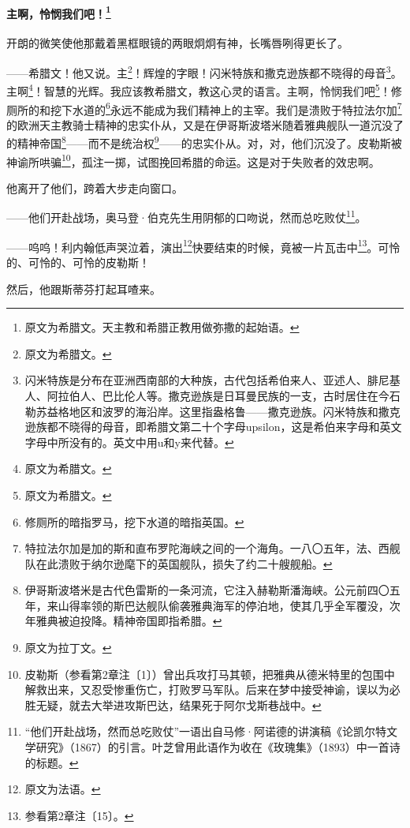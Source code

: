 \paragraph*{主啊，怜悯我们吧！\footnote{原文为希腊文。天主教和希腊正教用做弥撒的起始语。}}
\par 开朗的微笑使他那戴着黑框眼镜的两眼炯炯有神，长嘴唇咧得更长了。
\par ——希腊文！他又说。主\footnote{原文为希腊文。}！辉煌的字眼！闪米特族和撒克逊族都不晓得的母音\footnote{闪米特族是分布在亚洲西南部的大种族，古代包括希伯来人、亚述人、腓尼基人、阿拉伯人、巴比伦人等。撒克逊族是日耳曼民族的一支，古时居住在今石勒苏益格地区和波罗的海沿岸。这里指盎格鲁——撒克逊族。闪米特族和撒克逊族都不晓得的母音，即希腊文第二十个字母upsilon，这是希伯来字母和英文字母中所没有的。英文中用u和y来代替。}。主啊\footnote{原文为希腊文。}！智慧的光辉。我应该教希腊文，教这心灵的语言。主啊，怜悯我们吧\footnote{原文为希腊文。}！修厕所的和挖下水道的\footnote{修厕所的暗指罗马，挖下水道的暗指英国。}永远不能成为我们精神上的主宰。我们是溃败于特拉法尔加\footnote{特拉法尔加是加的斯和直布罗陀海峡之间的一个海角。一八〇五年，法、西舰队在此溃败于纳尔逊麾下的英国舰队，损失了约二十艘舰船。}的欧洲天主教骑士精神的忠实仆从，又是在伊哥斯波塔米随着雅典舰队一道沉没了的精神帝国\footnote{伊哥斯波塔米是古代色雷斯的一条河流，它注入赫勒斯潘海峡。公元前四〇五年，来山得率领的斯巴达舰队偷袭雅典海军的停泊地，使其几乎全军覆没，次年雅典被迫投降。精神帝国即指希腊。}——而不是统治权\footnote{原文为拉丁文。}——的忠实仆从。对，对，他们沉没了。皮勒斯被神谕所哄骗\footnote{皮勒斯（参看第2章注〔1〕）曾出兵攻打马其顿，把雅典从德米特里的包围中解救出来，又忍受惨重伤亡，打败罗马军队。后来在梦中接受神谕，误以为必胜无疑，就去大举进攻斯巴达，结果死于阿尔戈斯巷战中。}，孤注一掷，试图挽回希腊的命运。这是对于失败者的效忠啊。
\par 他离开了他们，跨着大步走向窗口。
\par ——他们开赴战场，奥马登·伯克先生用阴郁的口吻说，然而总吃败仗\footnote{“他们开赴战场，然而总吃败仗”一语出自马修·阿诺德的讲演稿《论凯尔特文学研究》（1867）的引言。叶芝曾用此语作为收在《玫瑰集》（1893）中一首诗的标题。}。
\par ——呜呜！利内翰低声哭泣着，演出\footnote{原文为法语。}快要结束的时候，竟被一片瓦击中\footnote{参看第2章注〔15〕。}。可怜的、可怜的、可怜的皮勒斯！
\par 然后，他跟斯蒂芬打起耳喳来。
